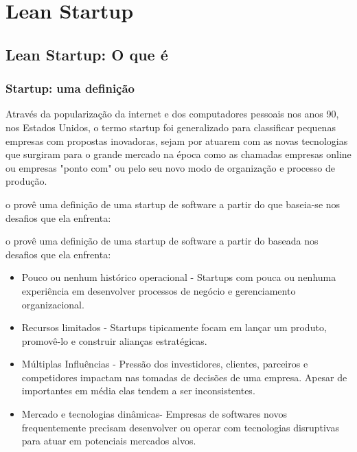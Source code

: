 \chapter{Lean Startup}
\label{cap:leanstartup}
\section{Lean Startup: O que é}
\subsection{Startup: uma definição}
\par Através da popularização da internet e dos computadores pessoais nos anos 90, nos Estados Unidos, o termo startup foi generalizado para classificar pequenas empresas com propostas inovadoras, sejam por atuarem com as novas tecnologias que surgiram para o grande mercado na época como as chamadas empresas online ou empresas "ponto com" ou  pelo seu novo modo de organização e processo de produção.
\par o \cite{nicolo:14} provê uma definição de uma startup de software a partir do \cite{sutton:00} que baseia-se nos desafios que ela enfrenta:
\par o \cite{nicolo:14} provê uma definição de uma startup de software a partir do \cite{sutton:00} baseada nos desafios que ela enfrenta:
\begin{itemize}
\item Pouco ou nenhum histórico operacional - Startups com pouca ou nenhuma experiência em desenvolver processos de negócio e gerenciamento organizacional.
\item Recursos limitados - Startups tipicamente focam em lançar um produto, promovê-lo e construir alianças estratégicas.
\item Múltiplas Influências - Pressão dos investidores, clientes, parceiros e competidores impactam nas tomadas de decisões de uma empresa. Apesar de importantes em média elas tendem a ser inconsistentes.
\item Mercado e tecnologias dinâmicas- Empresas de softwares novos frequentemente precisam desenvolver ou operar com tecnologias disruptivas para atuar em potenciais mercados alvos.
\end{itemize}

